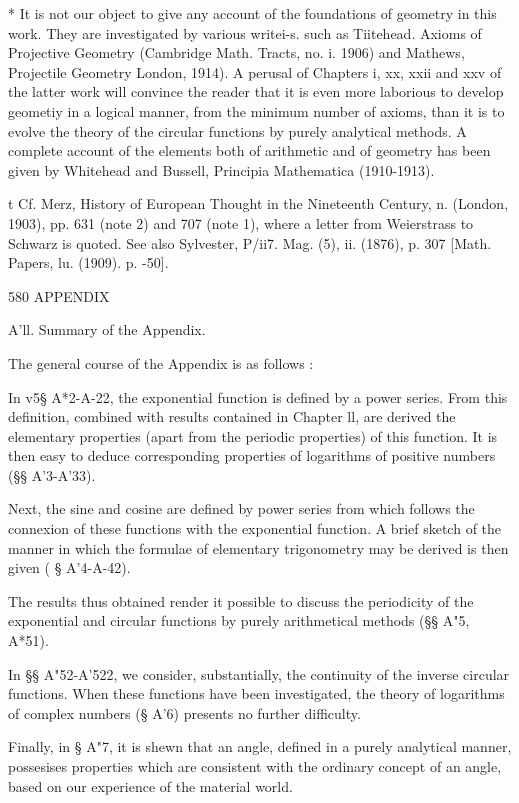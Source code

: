 * It is not our object to give any account of the foundations of geometry in this work. They 
are investigated by various writei-s. such as  Tiitehead. Axioms of Projective Geometry (Cambridge 
Math. Tracts, no. i. 1906) and Mathews, Projectile Geometry  London, 1914). A perusal of 
Chapters i, xx, xxii and xxv of the latter work will convince the reader that it is even more 
laborious to develop geometiy in a logical manner, from the minimum number of axioms, than 
it is to evolve the theory of the circular functions by purely analytical methods. A complete 
account of the elements both of arithmetic and of geometry has been given by Whitehead and 
Bussell, Principia Mathematica (1910-1913). 

t Cf. Merz, History of European Thought in the Nineteenth Century, n. (London, 1903), pp. 631 
(note 2) and 707 (note 1), where a letter from Weierstrass to Schwarz is quoted. See also 
Sylvester, P/ii7. Mag. (5), ii. (1876), p. 307 [Math. Papers, lu. (1909). p. -50]. 



580 APPENDIX 

A'll. Summary of the Appendix. 

The general course of the Appendix is as follows : 

In v5§ A*2-A-22, the exponential function is defined by a power series. From this 
definition, combined with results contained in Chapter ll, are derived the elementary 
properties (apart from the periodic properties) of this function. It is then easy to deduce 
corresponding properties of logarithms of positive numbers (§§ A'3-A'33). 

Next, the sine and cosine are defined by power series from which follows the connexion 
of these functions with the exponential function. A brief sketch of the manner in which 
the formulae of elementary trigonometry may be derived is then given ( § A'4-A-42). 

The results thus obtained render it possible to discuss the periodicity of the exponential 
and circular functions by purely arithmetical methods (§§ A"5, A*51). 

In §§ A"52-A'522, we consider, substantially, the continuity of the inverse circular 
functions. When these functions have been investigated, the theory of logarithms of 
complex numbers (§ A'6) presents no further difficulty. 

Finally, in § A"7, it is shewn that an angle, defined in a purely analytical manner, 
possesises properties which are consistent with the ordinary concept of an angle, based on 
our experience of the material world. 

